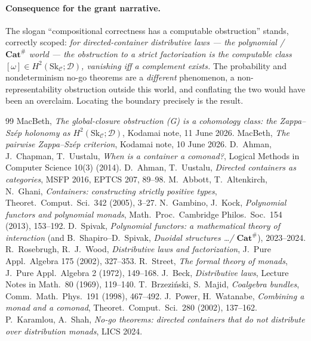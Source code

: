 \documentclass[11pt]{article}
\theoremstyle{definition}
\newcommand{\C}{\mathcal{C}}
\newcommand{\D}{\mathcal{D}}
\newcommand{\Sk}{\mathrm{Sk}}
\begin{document}
\paragraph{Consequence for the grant narrative.} The slogan ``compositional
correctness has a computable obstruction'' stands, correctly scoped: \emph{for
directed-container distributive laws --- the polynomial / $\mathbf{Cat}^{\#}$
world --- the obstruction to a strict factorization is the computable class
$[\omega]\in H^2(\Sk_\C;\D)$, vanishing iff a complement exists.} The probability
and nondeterminism no-go theorems are a \emph{different} phenomenon, a
non-representability obstruction outside this world, and conflating the two would
have been an overclaim. Locating the boundary precisely is the result.

\begin{thebibliography}{99}
 MacBeth, \emph{The global-closure obstruction (G) is a cohomology
class: the Zappa--Sz\'ep holonomy as $H^2(\Sk_\C;\D)$}, Kodamai note, 11 June 2026.
 MacBeth, \emph{The pairwise Zappa--Sz\'ep criterion}, Kodamai
note, 10 June 2026.
 D.~Ahman, J.~Chapman, T.~Uustalu, \emph{When is a container a
comonad?}, Logical Methods in Computer Science 10(3) (2014).
 D.~Ahman, T.~Uustalu, \emph{Directed containers as categories},
MSFP 2016, EPTCS 207, 89--98.
 M.~Abbott, T.~Altenkirch, N.~Ghani, \emph{Containers: constructing
strictly positive types}, Theoret.\ Comput.\ Sci.\ 342 (2005), 3--27.
 N.~Gambino, J.~Kock, \emph{Polynomial functors and polynomial
monads}, Math.\ Proc.\ Cambridge Philos.\ Soc.\ 154 (2013), 153--192.
 D.~Spivak, \emph{Polynomial functors: a mathematical theory
of interaction} (and B.~Shapiro--D.~Spivak, \emph{Duoidal structures \dots/
$\mathbf{Cat}^{\#}$}), 2023--2024.
 R.~Rosebrugh, R.~J.~Wood, \emph{Distributive laws and factorization},
J.\ Pure Appl.\ Algebra 175 (2002), 327--353.
 R.~Street, \emph{The formal theory of monads}, J.\ Pure Appl.\
Algebra 2 (1972), 149--168.
 J.~Beck, \emph{Distributive laws}, Lecture Notes in Math.\ 80 (1969),
119--140.
 T.~Brze\-zi\'nski, S.~Majid, \emph{Coalgebra bundles}, Comm.\ Math.\
Phys.\ 191 (1998), 467--492.
\bibitem{pw} J.~Power, H.~Watanabe, \emph{Combining a monad and a comonad}, Theoret.\
Comput.\ Sci.\ 280 (2002), 137--162.
\bibitem{ks} P.~Karamlou, A.~Shah, \emph{No-go theorems: directed containers that
do not distribute over distribution monads}, LICS 2024.
\end{thebibliography}
\end{document}
